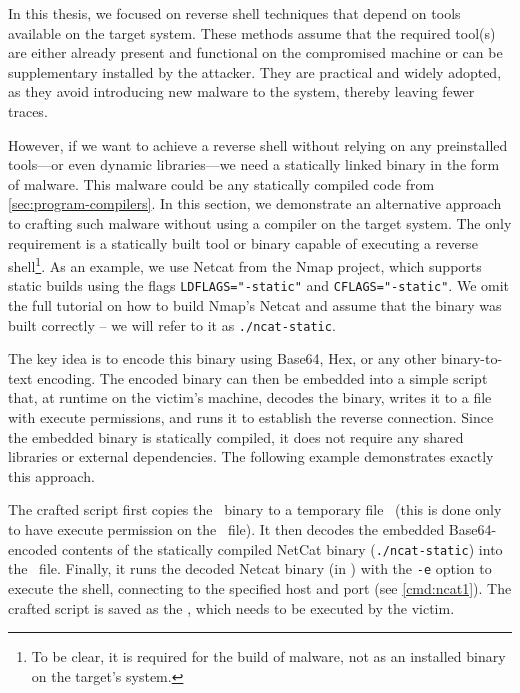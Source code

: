 In this thesis, we focused on reverse shell techniques that depend on tools available on the target system. These methods assume that the required tool(s) are either already present and functional on the compromised machine or can be supplementary installed by the attacker. They are practical and widely adopted, as they avoid introducing new malware to the system, thereby leaving fewer traces.

However, if we want to achieve a reverse shell without relying on any preinstalled tools—or even dynamic libraries—we need a statically linked binary in the form of malware. This malware could be any statically compiled code from \cref{sec:program-compilers}. In this section, we demonstrate an alternative approach to crafting such malware without using a compiler on the target system. The only requirement is a statically built tool or binary capable of executing a reverse shell\footnote{To be clear, it is required for the build of malware, not as an installed binary on the target's system.}. As an example, we use Netcat from the Nmap project, which supports static builds using the flags \texttt{LDFLAGS="-static"} and \texttt{CFLAGS="-static"}. We omit the full tutorial on how to build Nmap's Netcat and assume that the binary was built correctly -- we will refer to it as \texttt{./ncat-static}.

The key idea is to encode this binary using Base64, Hex, or any other binary-to-text encoding. The encoded binary can then be embedded into a simple script that, at runtime on the victim's machine, decodes the binary, writes it to a file with execute permissions, and runs it to establish the reverse connection. Since the embedded binary is statically compiled, it does not require any shared libraries or external dependencies.
The following example demonstrates exactly this approach.


The crafted script first copies the \shell\ binary to a temporary file \tmp\ (this is done only to have execute permission on the \tmp\ file). It then decodes the embedded Base64-encoded contents of the statically compiled NetCat binary (\texttt{./ncat-static}) into the \tmp\ file. Finally, it runs the decoded Netcat binary (in \tmp) with the \texttt{-e} option to execute the shell, connecting to the specified host and port (see \cref{cmd:ncat1}). The crafted script is saved as the \script, which needs to be executed by the victim.

